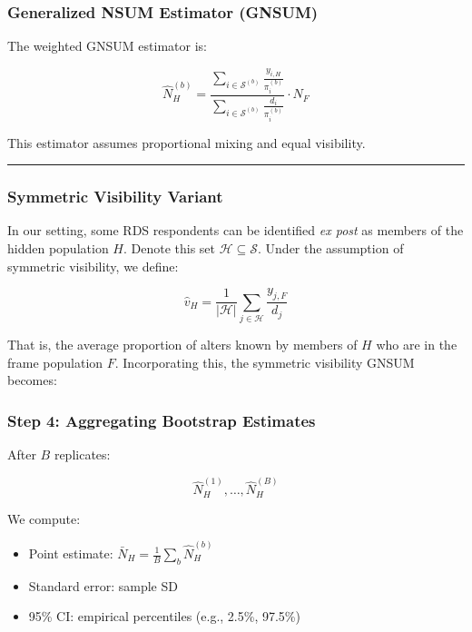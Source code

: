 \documentclass[
  12pt,
  letterpaper,
  DIV=11,
  numbers=noendperiod]{scrartcl}
\theoremstyle{plain}
\theoremstyle{definition}
\begin{document}
\subsubsection{Generalized NSUM Estimator
(GNSUM)}\label{generalized-nsum-estimator-gnsum}

The weighted GNSUM estimator is:

\[
\hat{N}_H^{(b)} = \frac{\sum_{i \in \mathcal{S}^{(b)}} \frac{y_{i,H}}{\pi_i^{(b)}}}{\sum_{i \in \mathcal{S}^{(b)}} \frac{d_i}{\pi_i^{(b)}}} \cdot N_F
\]

This estimator assumes proportional mixing and equal visibility.

\begin{center}\rule{0.5\linewidth}{0.5pt}\end{center}

\subsubsection{Symmetric Visibility
Variant}\label{symmetric-visibility-variant}

In our setting, some RDS respondents can be identified \emph{ex post} as
members of the hidden population \(H\). Denote this set
\(\mathcal{H} \subseteq \mathcal{S}\). Under the assumption of symmetric
visibility, we define:

\[
\hat{v}_{H} = \frac{1}{|\mathcal{H}|} \sum_{j \in \mathcal{H}} \frac{y_{j,F}}{d_j}
\]

That is, the average proportion of alters known by members of \(H\) who
are in the frame population \(F\). Incorporating this, the symmetric
visibility GNSUM becomes:

\subsubsection{Step 4: Aggregating Bootstrap
Estimates}\label{step-4-aggregating-bootstrap-estimates}

After \(B\) replicates:

\[\hat{N}_H^{(1)}, \dots, \hat{N}_H^{(B)}\]

We compute:

\begin{itemize}
\item
  Point estimate: \(\bar{N}_H = \frac{1}{B} \sum_b \hat{N}_H^{(b)}\)
\item
  Standard error: sample SD
\item
  95\% CI: empirical percentiles (e.g., 2.5\%, 97.5\%)
\end{itemize}
\end{document}
